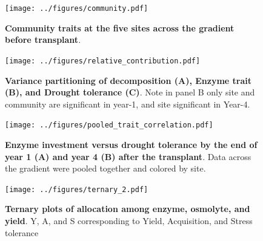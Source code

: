 \documentclass[letterpaper, 10pt]{article}
\begin{document}
\begin{figure}[h]
\centering
      \texttt{[image: ../figures/community.pdf]}
      \caption{\textbf{Community traits at the five sites across the gradient before transplant}.}
      \label{fig: figure 4}
\end{figure}


\begin{figure}[h]
\centering
      \texttt{[image: ../figures/relative\_contribution.pdf]}
      \caption{\textbf{Variance partitioning of decomposition (A), Enzyme trait (B), and
      Drought tolerance (C)}. Note in panel B only site and community are significant in year-1, and
      site significant in Year-4.}
      \label{fig: figure 4}
\end{figure}


\begin{figure}[h]
\centering
      \texttt{[image: ../figures/pooled\_trait\_correlation.pdf]}
      \caption{\textbf{Enzyme investment versus drought tolerance by the end of year 1 (A) and year 4 (B) after the transplant}. Data across the gradient were pooled together and colored by site.}
      \label{fig: figure 4}
\end{figure}


\begin{figure}[h]
\centering
      \texttt{[image: ../figures/ternary\_2.pdf]}
      \caption{\textbf{Ternary plots of allocation among enzyme, osmolyte, and yield}. Y, A, and S corresponding to Yield, Acquisition, and Stress tolerance}
      \label{fig: figure 3}
\end{figure}
\end{document}

